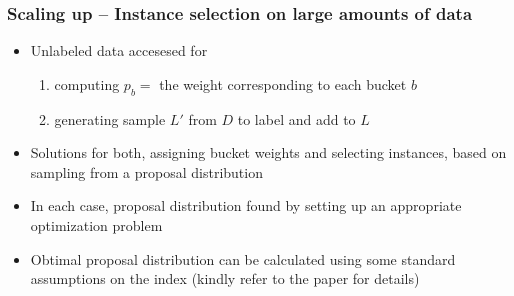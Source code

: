 \documentclass[11pt]{beamer}
\newcommand{\wt}{{p}}
\newlength{\wideitemsep}
\let\olditem\item
\renewcommand{\item}{\setlength{\itemsep}{\wideitemsep}\olditem}
\begin{document}
\begin{frame}
\frametitle{Scaling up -- Instance selection on large amounts of data} 
\begin{itemize}
\pause
\item Unlabeled data accesesed for 
\begin{enumerate}
\item computing $\wt_b=$ the weight corresponding to each bucket $b$ 
\item generating sample $L'$ from $D$ to label and add to $L$
\end{enumerate}
\vspace{1mm}
\pause
\item Solutions for both, assigning bucket weights and selecting instances, based on sampling from a proposal distribution
\vspace{1mm} \pause
\item In each case, proposal distribution found by setting up an appropriate optimization problem
\pause
\item Obtimal proposal distribution can be calculated using some standard assumptions on the index (kindly refer to the paper for details)
\end{itemize}
\end{frame}

\end{document}
